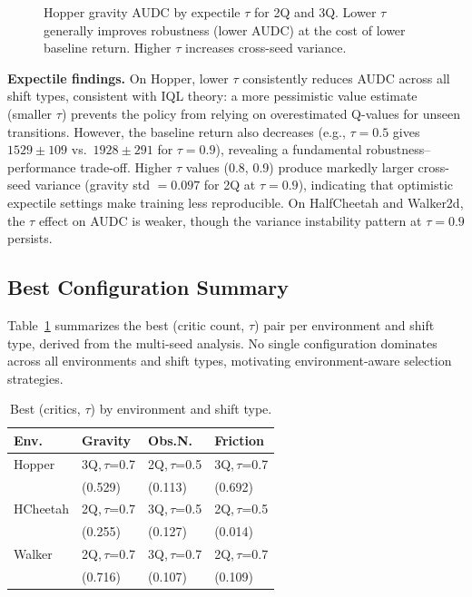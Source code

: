 \documentclass[conference]{IEEEtran}
\begin{document}
\begin{figure}[t]
\caption{Hopper gravity AUDC by expectile $\tau$ for 2Q and 3Q.
  Lower $\tau$ generally improves robustness (lower AUDC) at the cost
  of lower baseline return. Higher $\tau$ increases cross-seed variance.}
\label{fig:tau-hopper}
\end{figure}

\textbf{Expectile findings.}
On Hopper, lower $\tau$ consistently reduces AUDC across all shift types,
consistent with IQL theory: a more pessimistic value estimate (smaller $\tau$)
prevents the policy from relying on overestimated Q-values for unseen
transitions. However, the baseline return also decreases (e.g., $\tau=0.5$
gives $1529\pm109$ vs.\ $1928\pm291$ for $\tau=0.9$), revealing a fundamental
robustness--performance trade-off. Higher $\tau$ values (0.8, 0.9) produce
markedly larger cross-seed variance (gravity std $= 0.097$ for 2Q at
$\tau=0.9$), indicating that optimistic expectile settings make training less
reproducible. On HalfCheetah and Walker2d, the $\tau$ effect on AUDC is
weaker, though the variance instability pattern at $\tau=0.9$ persists.

\subsection{Best Configuration Summary}

Table~\ref{tab:best-config} summarizes the best (critic count, $\tau$) pair
per environment and shift type, derived from the multi-seed analysis. No single
configuration dominates across all environments and shift types, motivating
environment-aware selection strategies.

\begin{table}[h]
  \centering
  \caption{Best (critics, $\tau$) by environment and shift type.}
  \label{tab:best-config}
  \small
  \begin{tabular}{llll}
    \toprule
    Env. & Gravity & Obs.N. & Friction \\
    \midrule
    Hopper & 3Q,\,$\tau$=0.7 & 2Q,\,$\tau$=0.5 & 3Q,\,$\tau$=0.7 \\
           & (0.529) & (0.113) & (0.692) \\
    HCheetah& 2Q,\,$\tau$=0.7 & 3Q,\,$\tau$=0.5 & 2Q,\,$\tau$=0.5 \\
           & (0.255) & (0.127) & (0.014) \\
    Walker & 2Q,\,$\tau$=0.7 & 3Q,\,$\tau$=0.7 & 2Q,\,$\tau$=0.7 \\
           & (0.716) & (0.107) & (0.109) \\
    \bottomrule
  \end{tabular}
\end{table}
\end{document}
